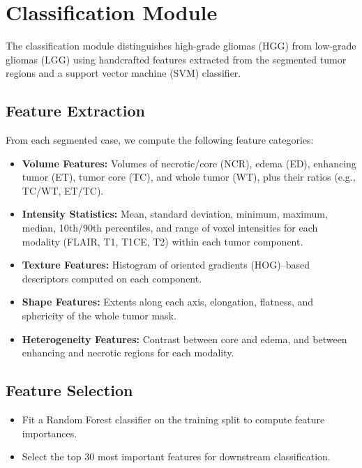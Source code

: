 \section{Classification Module}
\label{sec:contribution-classification}

The classification module distinguishes high‐grade gliomas (HGG) from low‐grade gliomas (LGG) using handcrafted features extracted from the segmented tumor regions and a support vector machine (SVM) classifier.

\subsection{Feature Extraction}
From each segmented case, we compute the following feature categories:
\begin{itemize}
  \item \textbf{Volume Features:} Volumes of necrotic/core (NCR), edema (ED), enhancing tumor (ET), tumor core (TC), and whole tumor (WT), plus their ratios (e.g., TC/WT, ET/TC).
  \item \textbf{Intensity Statistics:} Mean, standard deviation, minimum, maximum, median, 10th/90th percentiles, and range of voxel intensities for each modality (FLAIR, T1, T1CE, T2) within each tumor component.
  \item \textbf{Texture Features:} Histogram of oriented gradients (HOG)–based descriptors computed on each component.
  \item \textbf{Shape Features:} Extents along each axis, elongation, flatness, and sphericity of the whole tumor mask.
  \item \textbf{Heterogeneity Features:} Contrast between core and edema, and between enhancing and necrotic regions for each modality.
\end{itemize}

\subsection{Feature Selection}
\begin{itemize}
  \item Fit a Random Forest classifier on the training split to compute feature importances.
  \item Select the top 30 most important features for downstream classification.
\end{itemize}

